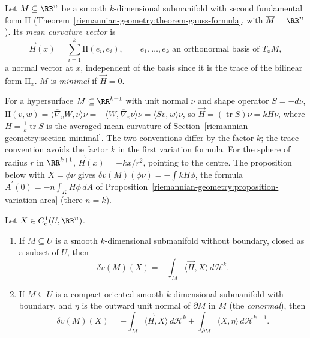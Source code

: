 \begin{definition}\label{varifolds:definition-mean-curvature-vector}
Let $M \subseteq \RR^n$ be a smooth $k$-dimensional submanifold with second fundamental form $\mathrm{II}$ (Theorem~\ref{riemannian-geometry:theorem-gauss-formula}, with $\overline{M} = \RR^n$). Its \emph{mean
curvature vector} is
\[
\vec{H}(x) = \sum_{i=1}^k\mathrm{II}(e_i, e_i), \qquad e_1, \ldots, e_k \text{ an orthonormal basis of } T_xM,
\]
a normal vector at $x$, independent of the basis since it is the trace of the bilinear form $\mathrm{II}_x$. $M$ is \emph{minimal} if $\vec{H} = 0$.
\end{definition}

\begin{remark}\label{varifolds:remark-mean-curvature-conventions}
For a hypersurface $M \subseteq \RR^{k+1}$ with unit normal $\nu$ and shape operator $S = -d\nu$, $\mathrm{II}(v, w) = \langle\overline{\nabla}_vW, \nu\rangle\nu = -\langle W, \overline{\nabla}_v\nu\rangle\nu = \langle Sv, w\rangle\nu$, so
$\vec{H} = (\operatorname{tr}S)\nu = kH\nu$, where $H = \frac1k\operatorname{tr}S$ is the averaged mean curvature of Section~\ref{riemannian-geometry:section-minimal}. The two conventions differ by the factor $k$;
the trace convention avoids the factor $k$ in the first variation formula. For the sphere of radius $r$ in $\RR^{k+1}$, $\vec{H}(x) = -kx/r^2$, pointing to the centre. The proposition below with $X = \phi\nu$
gives $\delta v(M)(\phi\nu) = -\int kH\phi$, the formula $A^{\prime}(0) = -n\int_KH\phi\,dA$ of Proposition~\ref{riemannian-geometry:proposition-variation-area} (there $n = k$).
\end{remark}

\begin{proposition}\label{varifolds:proposition-first-variation-submanifold}
Let $X \in C^1_c(U, \RR^n)$.
\begin{enumerate}
\item If $M \subseteq U$ is a smooth $k$-dimensional submanifold without boundary, closed as a subset of $U$, then
\[
\delta v(M)(X) = -\int_M\langle\vec{H}, X\rangle\,d\mathcal{H}^k .
\]
\item If $M \subseteq U$ is a compact oriented smooth $k$-dimensional submanifold with boundary, and $\eta$ is the outward unit normal of $\partial M$ in $M$ (the \emph{conormal}), then
\[
\delta v(M)(X) = -\int_M\langle\vec{H}, X\rangle\,d\mathcal{H}^k + \int_{\partial M}\langle X, \eta\rangle\,d\mathcal{H}^{k-1} .
\]
\end{enumerate}
\end{proposition}

